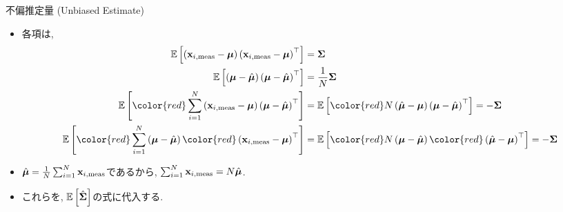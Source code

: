 \documentclass[dvipdfmx,notheorems,t]{beamer}
\begin{document}
\begin{frame}{不偏推定量 (Unbiased Estimate)}
\begin{itemize}
  \item 各項は,
  {\small \begin{align*}
    \E{\left( \vb{x}_{i, \mathrm{meas}} - \vb*{\mu} \right)
      \left( \vb{x}_{i, \mathrm{meas}} - \vb*{\mu} \right)^\top} &= \vb{\Sigma} \\
    \E{\left( \vb*{\mu} - \hat{\vb*{\mu}} \right)
      \left( \vb*{\mu} - \hat{\vb*{\mu}} \right)^\top} &= \frac{1}{N} \vb{\Sigma} \\
    \E{{\color{red} \sum_{i = 1}^N \left( \vb{x}_{i, \mathrm{meas}} - \vb*{\mu} \right)}
      \left( \vb*{\mu} - \hat{\vb*{\mu}} \right)^\top}
    &= \E{{\color{red} N \left( \hat{\vb*{\mu}} - \vb*{\mu} \right)}
      \left( \vb*{\mu} - \hat{\vb*{\mu}} \right)^\top}
      = -\vb{\Sigma} \\
    \E{{\color{red} \sum_{i = 1}^N} \left( \vb*{\mu} - \hat{\vb*{\mu}} \right)
      {\color{red} \left( \vb{x}_{i, \mathrm{meas}} - \vb*{\mu} \right)}^\top}
    &= \E{{\color{red} N} \left( \vb*{\mu} - \hat{\vb*{\mu}} \right)
      {\color{red} \left( \hat{\vb*{\mu}} - \vb*{\mu} \right)}^\top}
      = -\vb{\Sigma}
  \end{align*}}
  \item $\hat{\vb*{\mu}} = \frac{1}{N} \sum_{i = 1}^N \vb{x}_{i, \mathrm{meas}}$であるから,
  $\sum_{i = 1}^N \vb{x}_{i, \mathrm{meas}} = N \hat{\vb*{\mu}}$.
  \item これらを, $\operatorname{\mathbb{E}} \left[ \hat{\vb*{\Sigma}} \right]$の式に代入する.
\end{itemize}
\end{frame}
\end{document}
